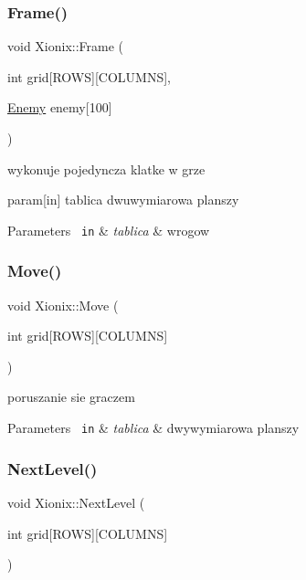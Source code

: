 \subsubsection{\texorpdfstring{Frame()}{Frame()}}
{\footnotesize\ttfamily void Xionix\+::\+Frame (\begin{DoxyParamCaption}\item[{int}]{grid\mbox{[}\+R\+O\+W\+S\mbox{]}\mbox{[}\+C\+O\+L\+U\+M\+N\+S\mbox{]},  }\item[{\mbox{\hyperlink{struct_xionix_1_1_enemy}{Enemy}}}]{enemy\mbox{[}100\mbox{]} }\end{DoxyParamCaption})\hspace{0.3cm}{\ttfamily [private]}}



wykonuje pojedyncza klatke w grze 

param\mbox{[}in\mbox{]} tablica dwuwymiarowa planszy 
\begin{DoxyParams}[1]{Parameters}
\mbox{\texttt{ in}}  & {\em tablica} & wrogow \\
\hline
\end{DoxyParams}
\mbox{\label{class_xionix_a093234e743648b902559789b8ee0d035}} 
\subsubsection{\texorpdfstring{Move()}{Move()}}
{\footnotesize\ttfamily void Xionix\+::\+Move (\begin{DoxyParamCaption}\item[{int}]{grid\mbox{[}\+R\+O\+W\+S\mbox{]}\mbox{[}\+C\+O\+L\+U\+M\+N\+S\mbox{]} }\end{DoxyParamCaption})\hspace{0.3cm}{\ttfamily [private]}}



poruszanie sie graczem 


\begin{DoxyParams}[1]{Parameters}
\mbox{\texttt{ in}}  & {\em tablica} & dwywymiarowa planszy \\
\hline
\end{DoxyParams}
\mbox{\label{class_xionix_ae1994086daa545ada9c595a236a987ce}} 
\subsubsection{\texorpdfstring{NextLevel()}{NextLevel()}}
{\footnotesize\ttfamily void Xionix\+::\+Next\+Level (\begin{DoxyParamCaption}\item[{int}]{grid\mbox{[}\+R\+O\+W\+S\mbox{]}\mbox{[}\+C\+O\+L\+U\+M\+N\+S\mbox{]} }\end{DoxyParamCaption})\hspace{0.3cm}{\ttfamily [private]}}



